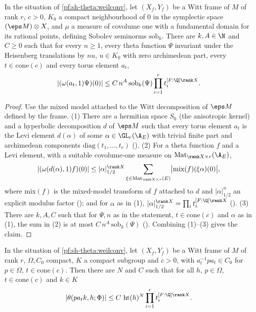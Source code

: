 \begin{lemma}\label{pf:sh-theta:torus}
In the situation of \cref{pf:sh-theta:weilconv}, let $(X_f,Y_f)$ be a Witt frame of $M$ of rank $r$, $c>0$, $K_0$ a compact
neighbourhood of $0$ in the symplectic space $(\eps M)\otimes X$, and $\mu$ a measure of covolume one with a fundamental domain for
its rational points, defining Sobolev seminorms $\mathrm{sob}_k$. There are $k,A\in\N$ and $C\ge0$ such that for every $n\ge1$, every
theta function $\Psi$ invariant under the Heisenberg translations by $nu$, $u\in K_0$ with zero archimedean part, every
$t\in\mathrm{cone}(c)$ and every torus element $a_t$,
\[
|(\omega(a_t,1)\Psi)(0)|\le C\,n^A\,\mathrm{sob}_k(\Psi)\prod_{i=1}^rt_i^{[F:\Q]\rank X}.
\]
\end{lemma}

\begin{proof}
Use the mixed model attached to the Witt decomposition of $\eps M$ defined by the frame. (1) There are a hermitian space $S_0$ (the
anisotropic kernel) and a hyperbolic decomposition $d$ of $\eps M$ such that every torus element $a_t$ is the Levi element $d(\alpha)$
of some $\alpha\in\GL_r(\A_E)$ with trivial finite part and archimedean components $\mathrm{diag}(t_1,\dots,t_r)$
(). (2) For a theta function $f$ and a Levi element, with a suitable
covolume-one measure on $\mathrm{Mat}_{\rank X\times r}(\A_E)$,
\[
|(\omega(d(\alpha),1)f)(0)|\le|\alpha|^{\rank X}_{1/2}\sum_{\xi\in\mathrm{Mat}_{\rank X\times r}(E)}\bigl|\mathrm{mix}(f)(\xi\alpha)(0)\bigr|,
\]
where $\mathrm{mix}(f)$ is the mixed-model transform of $f$ attached to $d$ and $|\alpha|^{n}_{1/2}$ an explicit modulus factor
(); and for $\alpha$ as in (1),
$|\alpha|^{\rank X}_{1/2}=\prod_it_i^{[F:\Q]\rank X}$ (). (3) There
are $k,A,C$ such that for $\Psi,n$ as in the statement, $t\in\mathrm{cone}(c)$ and $\alpha$ as in (1), the sum in (2) is at most
$C\,n^A\,\mathrm{sob}_k(\Psi)$ (). Combining (1)--(3) gives
the claim.
\end{proof}

\begin{lemma}\label{pf:sh-theta:siegelbound}
In the situation of \cref{pf:sh-theta:weilconv}, let $(X_f,Y_f)$ be a Witt frame of $M$ of rank $r$, $\Omega,C_0$ compact,
$K$ a compact subgroup and $c>0$, with $a_t^{-1}pa_t\in C_0$ for $p\in\Omega$, $t\in\mathrm{cone}(c)$. Then there are $N$ and
$C$ such that for all $h$, $p\in\Omega$, $t\in\mathrm{cone}(c)$ and $k\in K$
\[
|\theta(pa_tk,h;\Phi)|\le C\,\shthetaht(h)^N\prod_{i=1}^rt_i^{[F:\Q]\rank X}.
\]
\end{lemma}

